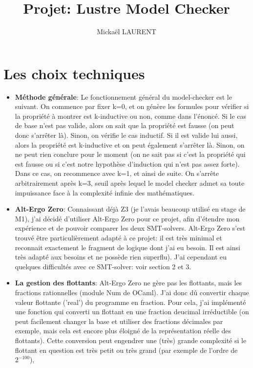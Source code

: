 \documentclass[a4paper]{article}%
\title{\vspace{1.5cm}Projet: Lustre Model Checker}
\author{Mickaël LAURENT}
\date{\vspace{-5ex}}
\begin{document}
    \maketitle

    \section{Les choix techniques}
		
	\begin{itemize}
		\item \textbf{Méthode générale}: Le fonctionnement général du model-checker est le suivant.
		On commence par fixer k=0, et on génère les formules pour vérifier si la propriété à montrer est k-inductive ou non, comme dans l'énoncé.
		Si le cas de base n'est pas valide, alors on sait que la propriété est fausse (on peut donc s'arrêter là). Sinon, on vérifie le cas inductif.
		Si il est valide lui aussi, alors la propriété est k-inductive et on peut également s'arrêter là. Sinon, on ne peut rien conclure pour le moment
		(on ne sait pas si c'est la propriété qui est fausse ou si c'est notre hypothèse d'induction qui n'est pas assez forte). Dans ce cas, on recommence avec k=1, et ainsi de suite.
		On s'arrête arbitrairement après k=3, seuil après lequel le model checker admet sa toute impuissance face à la complexité infinie des mathématiques.\\
		\item \textbf{Alt-Ergo Zero}: Connaissant déjà Z3 (je l'avais beaucoup utilisé en stage de M1), j'ai décidé d'utiliser Alt-Ergo Zero pour ce projet,
		afin d'étendre mon expérience et de pouvoir comparer les deux SMT-solvers. Alt-Ergo Zero s'est trouvé être particulièrement adapté à ce projet:
		il est très minimal et reconnait exactement le fragment de logique dont j'ai eu besoin. Il est ainsi très adapté aux besoins et ne possède rien superflu).
		J'ai cependant eu quelques difficultés avec ce SMT-solver: voir section 2 et 3.\\
		\item \textbf{La gestion des flottants}: Alt-Ergo Zero ne gère pas les flottants, mais les fractions rationnelles (module Num de OCaml).
		J'ai donc dû convertir chaque valeur flottante ('real') du programme en fraction. Pour cela, j'ai implémenté une fonction qui converti un flottant en une fraction
		deucimal irréductible (on peut facilement changer la base et utiliser des fractions décimales par exemple, mais cela est encore plus éloigné de la représentation réelle des flottants).
		Cette conversion peut engendrer une (très) grande complexité si le flottant en question est très petit ou très grand (par exemple de l'ordre de $2^{-100}$),

\end{itemize}
\end{document}
